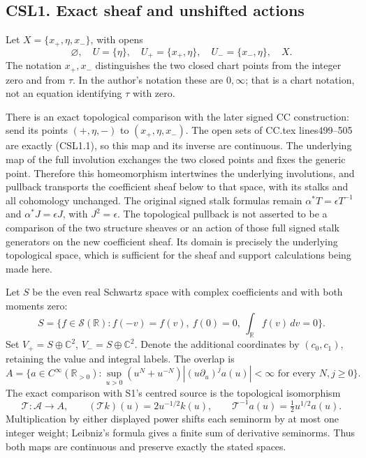 \subsection{CSL1. Exact sheaf and unshifted
actions}\label{csl1.-exact-sheaf-and-unshifted-actions}

Let \(X=\{x_+,\eta,x_-\}\), with opens \[
\varnothing,\quad U=\{\eta\},\quad
U_+=\{x_+,\eta\},\quad U_-=\{x_-,\eta\},\quad X.
\tag{CSL1.1}
\] The notation \(x_+,x_-\) distinguishes the two closed chart points
from the integer zero and from \(\tau\). In the author's notation these
are \(0,\infty\); that is a chart notation, not an equation identifying
\(\tau\) with zero.

There is an exact topological comparison with the later signed CC
construction: send its points \((+,\eta,-)\) to \((x_+,\eta,x_-)\). The
open sets of CC.tex lines499--505 are exactly (CSL1.1), so this map and
its inverse are continuous. The underlying map of the full involution
exchanges the two closed points and fixes the generic point. Therefore
this homeomorphism intertwines the underlying involutions, and pullback
transports the coefficient sheaf below to that space, with its stalks
and all cohomology unchanged. The original signed stalk formulas remain
\(\alpha^*T=\epsilon T^{-1}\) and \(\alpha^*J=\epsilon J\), with
\(J^2=\epsilon\). The topological pullback is not asserted to be a
comparison of the two structure sheaves or an action of those full
signed stalk generators on the new coefficient sheaf. Its domain is
precisely the underlying topological space, which is sufficient for the
sheaf and support calculations being made here.

Let \(S\) be the even real Schwartz space with complex coefficients and
with both moments zero: \[
S=\{f\in\mathcal S(\mathbb R):f(-v)=f(v),\ f(0)=0,\ \int_{\mathbb R}f(v)\,dv=0\}.
\tag{CSL1.2}
\] Set \(V_+=S\oplus\mathbb C^2\), \(V_-=S\oplus\mathbb C^2\). Denote
the additional coordinates by \((c_0,c_1)\), retaining the value and
integral labels. The overlap is \[
A=\{a\in C^\infty(\mathbb R_{>0}):
\sup_{u>0}(u^N+u^{-N})|(u\partial_u)^j a(u)|<\infty
\text{ for every }N,j\ge0\}.
\tag{CSL1.3}
\] The exact comparison with S1's centred source is the topological
isomorphism \[
\mathcal T:\mathcal A\longrightarrow A,\qquad
(\mathcal T k)(u)=2u^{-1/2}k(u),\qquad
\mathcal T^{-1}a(u)=\tfrac12u^{1/2}a(u).
\tag{CSL1.4}
\] Multiplication by either displayed power shifts each seminorm by at
most one integer weight; Leibniz's formula gives a finite sum of
derivative seminorms. Thus both maps are continuous and preserve exactly
the stated spaces.

